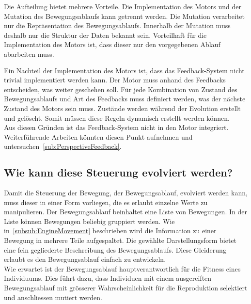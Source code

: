      \smallskip

      Die Aufteilung bietet mehrere Vorteile.
      Die Implementation des Motors und der Mutation des Bewegungsablaufs kann getrennt werden.
      Die Mutation verarbeitet nur die Repräsentation des Bewegungsablaufs.
      Innerhalb der Mutation muss deshalb nur die Struktur der Daten bekannt sein.
      Vorteilhaft für die Implementation des Motors ist, dass dieser nur den vorgegebenen Ablauf abarbeiten muss.

      \smallskip

      Ein Nachteil der Implementation des Motors ist, dass das Feedback-System nicht trivial implementiert werden kann.
      Der Motor muss anhand des Feedbacks entscheiden, was weiter geschehen soll.
      Für jede Kombination von Zustand des Bewegungsablaufs und Art des Feedbacks muss definiert werden,
      was der nächste Zustand des Motors sein muss.
      Zustände werden während der Evolution erstellt und gelöscht.
      Somit müssen diese Regeln dynamisch erstellt werden können.
      \\
      Aus diesen Gründen ist das Feedback-System nicht in den Motor integriert.
      Weiterführende Arbeiten könnten diesen Punkt aufnehmen und untersuchen~\vref{sub:PerspectiveFeedback}.

    \subsection{Wie kann diese Steuerung evolviert werden?\label{sub:wieStEv}}

      Damit die Steuerung der Bewegung, der Bewegungsablauf, evolviert werden kann,
      muss dieser in einer Form vorliegen, die es erlaubt einzelne Werte zu manipulieren.
      Der Bewegungsablauf beinhaltet eine Liste von Bewegungen.
      In der Liste können Bewegungen beliebig gruppiert werden.
      Wie in~\vref{subsub:EngineMovement} beschrieben
      wird die Information zu einer Bewegung in mehrere Teile aufgespaltet.
      Die gewählte Darstellungsform bietet eine fein gegliederte Beschreibung des Bewegungsablaufs.
      Diese Gleiderung erlaubt es den Bewegungsablauf einfach zu entwickeln.
      \\
      Wie erwartet ist der Bewegungsablauf hauptverantwortlich für die Fitness eines Individuums.
      Dies führt dazu, dass Individuen mit einem ausgereiften Bewegungsablauf mit grösserer Wahrscheinlichkeit
      für die Reproduktion selektiert und anschliessen mutiert werden.

